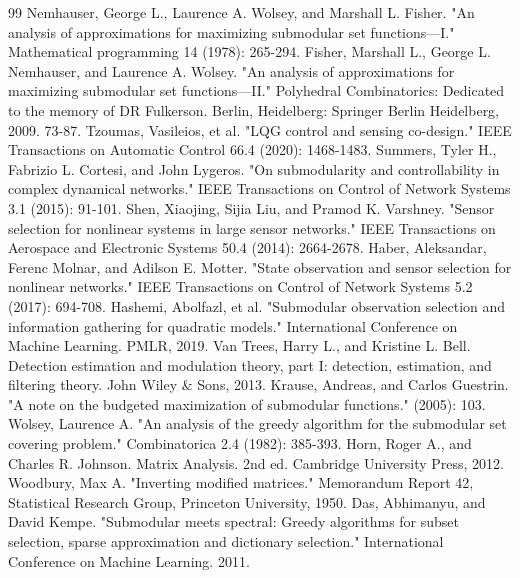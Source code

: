 \documentclass[letterpaper, 10 pt, conference]{ieeeconf}  %
\begin{document}
\begin{thebibliography}{99}
 Nemhauser, George L., Laurence A. Wolsey, and Marshall L. Fisher. "An analysis of approximations for maximizing submodular set functions—I." Mathematical programming 14 (1978): 265-294.
 Fisher, Marshall L., George L. Nemhauser, and Laurence A. Wolsey. "An analysis of approximations for maximizing submodular set functions—II." Polyhedral Combinatorics: Dedicated to the memory of DR Fulkerson. Berlin, Heidelberg: Springer Berlin Heidelberg, 2009. 73-87.
 Tzoumas, Vasileios, et al. "LQG control and sensing co-design." IEEE Transactions on Automatic Control 66.4 (2020): 1468-1483.
 Summers, Tyler H., Fabrizio L. Cortesi, and John Lygeros. "On submodularity and controllability in complex dynamical networks." IEEE Transactions on Control of Network Systems 3.1 (2015): 91-101.
 Shen, Xiaojing, Sijia Liu, and Pramod K. Varshney. "Sensor selection for nonlinear systems in large sensor networks." IEEE Transactions on Aerospace and Electronic Systems 50.4 (2014): 2664-2678.
 Haber, Aleksandar, Ferenc Molnar, and Adilson E. Motter. "State observation and sensor selection for nonlinear networks." IEEE Transactions on Control of Network Systems 5.2 (2017): 694-708.
 Hashemi, Abolfazl, et al. "Submodular observation selection and information gathering for quadratic models." International Conference on Machine Learning. PMLR, 2019.
 Van Trees, Harry L., and Kristine L. Bell. Detection estimation and modulation theory, part I: detection, estimation, and filtering theory. John Wiley & Sons, 2013.
 Krause, Andreas, and Carlos Guestrin. "A note on the budgeted maximization of submodular functions." (2005): 103.
 Wolsey, Laurence A. "An analysis of the greedy algorithm for the submodular set covering problem." Combinatorica 2.4 (1982): 385-393.
 Horn, Roger A., and Charles R. Johnson. Matrix Analysis. 2nd ed. Cambridge University Press, 2012.
 Woodbury, Max A. "Inverting modified matrices." Memorandum Report 42, Statistical Research Group, Princeton University, 1950.
 Das, Abhimanyu, and David Kempe. "Submodular meets spectral: Greedy algorithms for subset selection, sparse approximation and dictionary selection." International Conference on Machine Learning. 2011.
\end{thebibliography}

\end{document}
